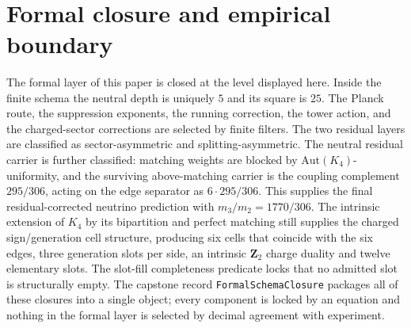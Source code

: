 \documentclass[11pt]{article}
\begin{document}
\begin{code}
%
\>[2]\AgdaSymbol{;}\AgdaSpace{}%
%
\>[30]\AgdaSymbol{=}\AgdaSpace{}%
\<%
\\
%
\>[2]\AgdaSymbol{;}\AgdaSpace{}%
%
\>[30]\AgdaSymbol{=}\AgdaSpace{}%
\<%
\\
%
\>[2]\AgdaSymbol{;}\AgdaSpace{}%
%
\>[30]\AgdaSymbol{=}\AgdaSpace{}%
\<%
\\
%
\>[2]\AgdaSymbol{;}\AgdaSpace{}%
\AgdaSpace{}%
\AgdaSymbol{=}\AgdaSpace{}%
\<%
\\
%
\>[2]\AgdaSymbol{;}\AgdaSpace{}%
%
\>[30]\AgdaSymbol{=}\AgdaSpace{}%
\<%
\\
%
\>[2]\AgdaSymbol{;}\AgdaSpace{}%
%
\>[30]\AgdaSymbol{=}\AgdaSpace{}%
\<%
\\
%
\>[2]\AgdaSymbol{;}\AgdaSpace{}%
%
\>[30]\AgdaSymbol{=}\AgdaSpace{}%
\<%
\\
%
\>[2]\AgdaSymbol{;}\AgdaSpace{}%
%
\>[30]\AgdaSymbol{=}\AgdaSpace{}%
\<%
\\
%
\>[2]\AgdaSymbol{\}}\<%
\end{code}

\section*{Formal closure and empirical boundary}

The formal layer of this paper is closed at the level displayed
here.  Inside the finite schema the neutral depth is uniquely $5$ and
its square is $25$.  The Planck route, the suppression exponents, the
running correction, the tower action, and the charged-sector corrections
are selected by finite filters.  The two residual layers are classified
as sector-asymmetric and splitting-asymmetric.  The neutral residual
carrier is further classified: matching weights are blocked by
$\mathrm{Aut}(K_4)$-uniformity, and the surviving above-matching carrier
is the coupling complement $295/306$, acting on the edge separator as
$6\cdot 295/306$.  This supplies the final residual-corrected neutrino
prediction with $m_3/m_2=1770/306$.  The intrinsic extension of $K_4$ by
its bipartition and perfect matching still supplies the charged
sign/generation cell structure, producing six cells that coincide with
the six edges, three generation slots per side, an intrinsic
$\mathbf{Z}_2$ charge duality and twelve elementary slots.  The slot-fill
completeness predicate locks that no admitted slot is structurally empty.
The capstone record \texttt{FormalSchemaClosure} packages all of these
closures into a single object; every component is locked by an equation
and nothing in the formal layer is selected by decimal agreement with
experiment.
\end{document}
